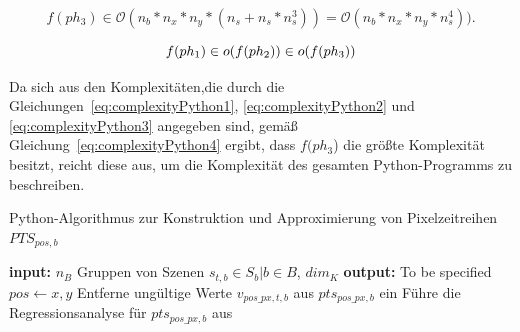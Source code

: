 \begin{equation} \label{eq:complexityPython3}
f(ph_3) \in \mathcal{O}(n_b * n_x * n_y * (n_s + n_s * n_s^3)) = \mathcal{O}(n_b * n_x * n_y * n_s^4)).
\end{equation}

\begin{equation} \label{eq:complexityPython4}
f(ph_1) \in \mathnormal{o}(f(ph_2)) \in \mathnormal{o}(f(ph_3))
\end{equation}

Da sich aus den Komplexitäten,die durch die Gleichungen~\ref{eq:complexityPython1}, \ref{eq:complexityPython2} und \ref{eq:complexityPython3} angegeben sind, gemäß Gleichung~\ref{eq:complexityPython4} ergibt, dass $f(ph_3$) die größte Komplexität besitzt, reicht diese aus, um die Komplexität des gesamten Python-Programms zu beschreiben.

\begin{algorithm}[H]
\small
\caption{Python-Algorithmus zur Konstruktion und Approximierung von Pixelzeitreihen $PTS_{pos, b}$}
\label{alg:python}
\begin{algorithmic}[1]
	\State \textbf{input:} $n_B$ Gruppen von Szenen $s_{t, b} \in S_{b} | b \in B$, $dim_K$
	\State \textbf{output:} To be specified
	  \label{alg:iterB}
        		  \label{alg:iterX}
			  \label{alg:iterY}
				\State $pos \leftarrow x, y$  
				  \label{alg:iterPTS}
					\State Entferne ungültige Werte $v_{pos\_px, t, b}$ aus $pts_{pos\_px, b}$ ein  
				\EndFor
				\State Führe die Regressionsanalyse für $pts_{pos\_px, b}$ aus  \label{alg:regression}
			\EndFor
		\EndFor
	\EndFor
		
		 
	\EndFunction
\end{algorithmic}
\end{algorithm}

